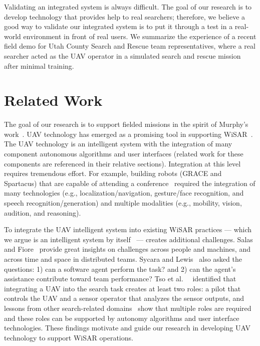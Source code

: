 Validating an integrated system is always difficult. The goal of our research is to develop technology that provides help to real searchers; therefore, we believe a good way to validate our integrated system is to put it through a test in a real-world environment in front of real users. We summarize the experience of a recent field demo for Utah County Search and Rescue team representatives, where a real searcher acted as the UAV operator in a simulated search and rescue mission after minimal training.



\section{Related Work}

The goal of our research is to support fielded missions in the spirit of Murphy's work~\cite{Casper2003Human}. UAV technology has emerged as a promising tool in supporting WiSAR~\cite{Bourgault2003Coordinated,Murphy2008Cooperative}. The UAV technology is an intelligent system with the integration of many component autonomous algorithms and user interfaces (related work for these components are referenced in their relative sections). Integration at this level requires tremendous effort. For example, building robots (GRACE and Spartacus) that are capable of attending a conference~\cite{Simmons2003Grace,Michaud2007Spartacus} required the integration of many technologies (e.g., localization/navigation, gesture/face recognition, and speech recognition/generation) and multiple modalities (e.g., mobility, vision, audition, and reasoning).

To integrate the UAV intelligent system into existing WiSAR practices --- which we argue is an intelligent system by itself~\cite{Setnicka1980Wilderness} --- creates additional challenges. Salas and Fiore~ provide great insights on challenges across people and machines, and across time and space in distributed teams. Sycara and Lewis~ also asked the questions: 1) can a software agent perform the task? and 2) can the agent's assistance contribute toward team performance? Tso et al.\ ~ identified that integrating a UAV into the search task creates at least two roles: a pilot that controls the UAV and a sensor operator that analyzes the sensor outputs, and lessons from other search-related domains~\cite{Drury2003Awareness} show that multiple roles are required and these roles can be supported by autonomy algorithms and user interface technologies. These findings motivate and guide our research in developing UAV technology to support WiSAR operations.


